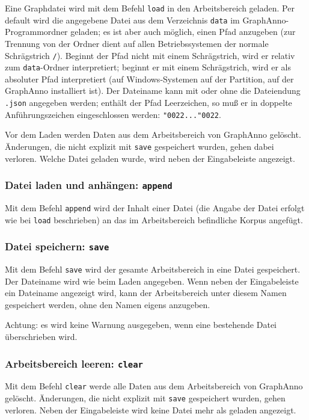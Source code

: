 \documentclass[12pt]{scrartcl}
\newcommand{\quo}{\char"0022}
\begin{document}
Eine Graphdatei wird mit dem Befehl \texttt{load} in den Arbeitsbereich geladen. Per default wird die angegebene Datei aus dem Verzeichnis \texttt{data} im GraphAnno-Programmordner geladen; es ist aber auch möglich, einen Pfad anzugeben (zur Trennung von der Ordner dient auf allen Betriebssystemen der normale Schrägstrich \texttt{/}). Beginnt der Pfad nicht mit einem Schrägstrich, wird er relativ zum \texttt{data}-Ordner interpretiert; beginnt er mit einem Schrägstrich, wird er als absoluter Pfad interpretiert (auf Windows-Systemen auf der Partition, auf der GraphAnno installiert ist). Der Dateiname kann mit oder ohne die Dateiendung \texttt{.json} angegeben werden; enthält der Pfad Leerzeichen, so muß er in doppelte Anführungszeichen eingeschlossen werden: \texttt{\quo...\quo}.

Vor dem Laden werden Daten aus dem Arbeitsbereich von GraphAnno gelöscht. Änderungen, die nicht explizit mit \texttt{save} gespeichert wurden, gehen dabei verloren.
Welche Datei geladen wurde, wird neben der Eingabeleiste angezeigt.


\subsubsection{Datei laden und anhängen: \texttt{append}}

Mit dem Befehl \texttt{append} wird der Inhalt einer Datei (die Angabe der Datei erfolgt wie bei \texttt{load} beschrieben) an das im Arbeitsbereich befindliche Korpus angefügt.


\subsubsection{Datei speichern: \texttt{save}}

Mit dem Befehl \texttt{save} wird der gesamte Arbeitsbereich in eine Datei gespeichert. Der Dateiname wird wie beim Laden angegeben. Wenn neben der Eingabeleiste ein Dateiname angezeigt wird, kann der Arbeitsbereich unter diesem Namen gespeichert werden, ohne den Namen eigens anzugeben.

Achtung: es wird keine Warnung ausgegeben, wenn eine bestehende Datei überschrieben wird.


\subsubsection{Arbeitsbereich leeren: \texttt{clear}}

Mit dem Befehl \texttt{clear} werde alle Daten aus dem Arbeitsbereich von GraphAnno gelöscht. Änderungen, die nicht explizit mit \texttt{save} gespeichert wurden, gehen verloren.
Neben der Eingabeleiste wird keine Datei mehr als geladen angezeigt.
\end{document}
